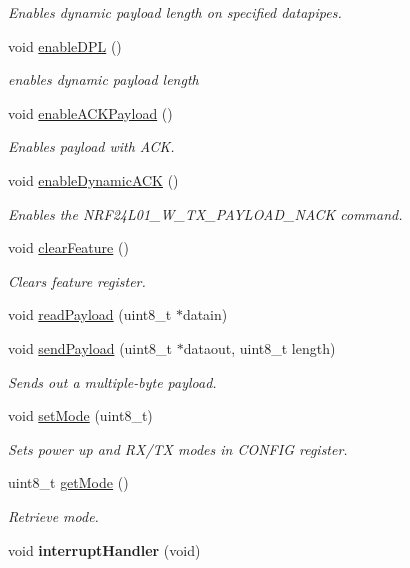 \begin{DoxyCompactItemize}
\begin{DoxyCompactList}\small\item\em Enables dynamic payload length on specified datapipes. \end{DoxyCompactList}\item 
void \hyperlink{classn_r_f24_l01_a61d5abec43f3e46b18e3ca22f848ae03}{enable\-D\-P\-L} ()
\begin{DoxyCompactList}\small\item\em enables dynamic payload length \end{DoxyCompactList}\item 
void \hyperlink{classn_r_f24_l01_a48c43c5c5fabfc9fa75323316e5e0d5e}{enable\-A\-C\-K\-Payload} ()
\begin{DoxyCompactList}\small\item\em Enables payload with A\-C\-K. \end{DoxyCompactList}\item 
void \hyperlink{classn_r_f24_l01_a3e68a295f5848e2cf3194c7462676e9d}{enable\-Dynamic\-A\-C\-K} ()
\begin{DoxyCompactList}\small\item\em Enables the N\-R\-F24\-L01\-\_\-\-W\-\_\-\-T\-X\-\_\-\-P\-A\-Y\-L\-O\-A\-D\-\_\-\-N\-A\-C\-K command. \end{DoxyCompactList}\item 
void \hyperlink{classn_r_f24_l01_af044e93bfbee8a3362479318a43f93e1}{clear\-Feature} ()
\begin{DoxyCompactList}\small\item\em Clears feature register. \end{DoxyCompactList}\item 
void \hyperlink{classn_r_f24_l01_aa5e0e8a467af8cfcf264442f4d87411c}{read\-Payload} (uint8\-\_\-t $\ast$datain)
\item 
void \hyperlink{classn_r_f24_l01_a7fdf8f83f4f5a402f22aee6a20a7b581}{send\-Payload} (uint8\-\_\-t $\ast$dataout, uint8\-\_\-t length)
\begin{DoxyCompactList}\small\item\em Sends out a multiple-\/byte payload. \end{DoxyCompactList}\item 
void \hyperlink{classn_r_f24_l01_ace8af8e299a991fb913ecad5155f6bbf}{set\-Mode} (uint8\-\_\-t)
\begin{DoxyCompactList}\small\item\em Sets power up and R\-X/\-T\-X modes in C\-O\-N\-F\-I\-G register. \end{DoxyCompactList}\item 
uint8\-\_\-t \hyperlink{classn_r_f24_l01_a3d52b9fd9632d996f1bc84448fdc08f8}{get\-Mode} ()
\begin{DoxyCompactList}\small\item\em Retrieve mode. \end{DoxyCompactList}\item 
\hypertarget{classn_r_f24_l01_a990987b803e0d3215410c2d748840943}{void {\bfseries interrupt\-Handler} (void)}\label{classn_r_f24_l01_a990987b803e0d3215410c2d748840943}

\end{DoxyCompactItemize}
